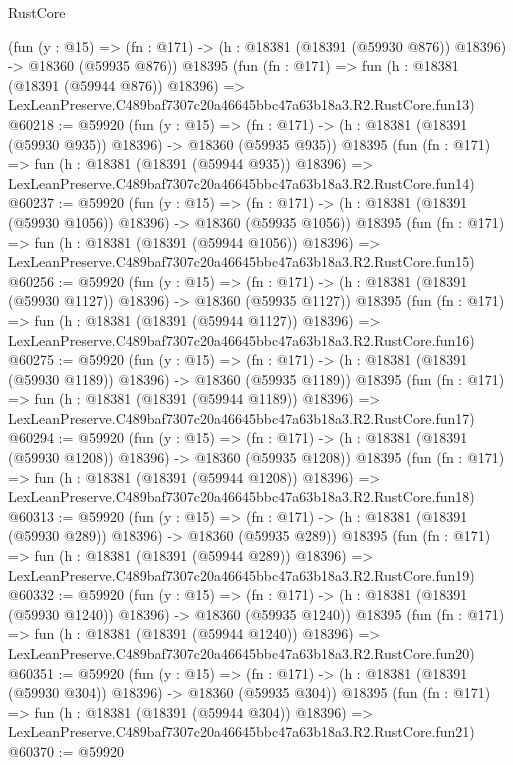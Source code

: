 \begin{lexlean}{RustCore}
\begin{coremodule}
    (fun (y : @15) =>
    (fn : @171) -> (h : @18381 (@18391 (@59930 @876)) @18396) -> @18360 (@59935 @876))
    @18395
    (fun (fn : @171) =>
    fun (h : @18381 (@18391 (@59944 @876)) @18396) =>
    LexLeanPreserve.C489baf7307c20a46645bbc47a63b18a3.R2.RustCore.fun13)
@60218 := @59920
    (fun (y : @15) =>
    (fn : @171) -> (h : @18381 (@18391 (@59930 @935)) @18396) -> @18360 (@59935 @935))
    @18395
    (fun (fn : @171) =>
    fun (h : @18381 (@18391 (@59944 @935)) @18396) =>
    LexLeanPreserve.C489baf7307c20a46645bbc47a63b18a3.R2.RustCore.fun14)
@60237 := @59920
    (fun (y : @15) =>
    (fn : @171) -> (h : @18381 (@18391 (@59930 @1056)) @18396) -> @18360 (@59935 @1056))
    @18395
    (fun (fn : @171) =>
    fun (h : @18381 (@18391 (@59944 @1056)) @18396) =>
    LexLeanPreserve.C489baf7307c20a46645bbc47a63b18a3.R2.RustCore.fun15)
@60256 := @59920
    (fun (y : @15) =>
    (fn : @171) -> (h : @18381 (@18391 (@59930 @1127)) @18396) -> @18360 (@59935 @1127))
    @18395
    (fun (fn : @171) =>
    fun (h : @18381 (@18391 (@59944 @1127)) @18396) =>
    LexLeanPreserve.C489baf7307c20a46645bbc47a63b18a3.R2.RustCore.fun16)
@60275 := @59920
    (fun (y : @15) =>
    (fn : @171) -> (h : @18381 (@18391 (@59930 @1189)) @18396) -> @18360 (@59935 @1189))
    @18395
    (fun (fn : @171) =>
    fun (h : @18381 (@18391 (@59944 @1189)) @18396) =>
    LexLeanPreserve.C489baf7307c20a46645bbc47a63b18a3.R2.RustCore.fun17)
@60294 := @59920
    (fun (y : @15) =>
    (fn : @171) -> (h : @18381 (@18391 (@59930 @1208)) @18396) -> @18360 (@59935 @1208))
    @18395
    (fun (fn : @171) =>
    fun (h : @18381 (@18391 (@59944 @1208)) @18396) =>
    LexLeanPreserve.C489baf7307c20a46645bbc47a63b18a3.R2.RustCore.fun18)
@60313 := @59920
    (fun (y : @15) =>
    (fn : @171) -> (h : @18381 (@18391 (@59930 @289)) @18396) -> @18360 (@59935 @289))
    @18395
    (fun (fn : @171) =>
    fun (h : @18381 (@18391 (@59944 @289)) @18396) =>
    LexLeanPreserve.C489baf7307c20a46645bbc47a63b18a3.R2.RustCore.fun19)
@60332 := @59920
    (fun (y : @15) =>
    (fn : @171) -> (h : @18381 (@18391 (@59930 @1240)) @18396) -> @18360 (@59935 @1240))
    @18395
    (fun (fn : @171) =>
    fun (h : @18381 (@18391 (@59944 @1240)) @18396) =>
    LexLeanPreserve.C489baf7307c20a46645bbc47a63b18a3.R2.RustCore.fun20)
@60351 := @59920
    (fun (y : @15) =>
    (fn : @171) -> (h : @18381 (@18391 (@59930 @304)) @18396) -> @18360 (@59935 @304))
    @18395
    (fun (fn : @171) =>
    fun (h : @18381 (@18391 (@59944 @304)) @18396) =>
    LexLeanPreserve.C489baf7307c20a46645bbc47a63b18a3.R2.RustCore.fun21)
@60370 := @59920

\end{coremodule}
\end{lexlean}
